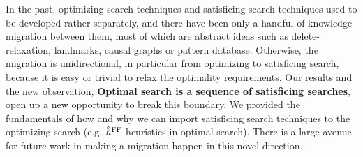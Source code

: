 In the past, optimizing search techniques and satisficing search techniques used to be developed rather separately, and there have been only a handful of knowledge migration between them, most of which are abstract ideas such as delete-relaxation, landmarks, causal graphs or pattern database.
Otherwise, the migration is unidirectional, in particular from optimizing to satisficing search, because it is easy or trivial to relax the optimality requirements.
% 
Our results and the new observation, \textbf{Optimal search is a sequence of satisficing searches}, open up a new
opportunity to break this boundary.  We provided the fundamentals of how and why we can import satisficing search
techniques to the optimizing search (e.g. $\hat{h}^{\text{FF}}$ heuristics in optimal search).  There is a large avenue for future
work in making a migration happen in this novel direction.

